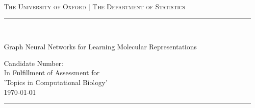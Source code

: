 \begin{titlingpage}
\begin{center}
		
		
		
		
		
		\textsc{\centering The University of Oxford | The Department of Statistics}\\[0.2cm]
		
		\newcommand{\HRule}{\rule{\linewidth}{0.5mm}}
		
		
		\begin{flushright}
			\HRule \\[.05cm]
		{  \huge \sc Graph Neural Networks for Learning Molecular Representations\par }
		\vspace*{.6cm}
		{\Large \sc Candidate Number:}\\[0.6cm]
		{\large In Fulfillment of Assessment for \\ 'Topics in Computational Biology'}\\[0.2cm]
		{\today}\\[.05cm]
		\HRule \\[0.4cm]
		\end{flushright}
		
	\end{center}
\begin{abstract}
	\noindent
Der Abstract fasst die zentralen Inhalte der Arbeit zusammen. Eine Wertung oder Interpretation erfolgt nicht. Dies hilft, sich einen groben Überblick über Fragestellung, Vorgehen und Ergebnisse zu verschaffen. Bestandteil sollen die Teile a) Hintergrundinformationen, Fragestellung, Zielsetzung, Forschungskontext, b) Methoden, c) Ergebnisse und d) Schlussfolgerungen, Anwendungsmöglichkeiten sein. Der Text ist knapp, vollständig und präzise, zudem objektiv und ohne persönliche Wertung. Achten Sie auf eine einfache und verständliche Sprache. Alle genannten Inhalte müssen auch im Hauptteil aufgegriffen werden. Den Inhalt objektiv und ohne persönliche Wertung wiedergeben. Gehen Sie auf die wichtigsten Konzepte, Resultate oder Folgerungen ein. Verwenden Sie keine Zitate und verzichten Sie auf Abkürzungen. In der Regel sind ca. 200 Wörter ausreichend.
\end{abstract}
\tableofcontents
\end{titlingpage}



\setcounter{tocdepth}{2}

